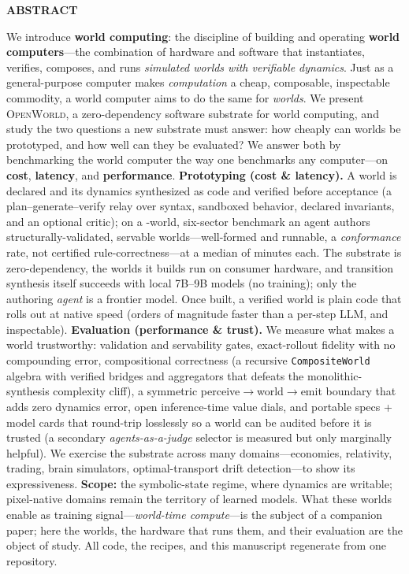 \documentclass[11pt]{article}
\newcommand{\openworld}{\textsc{OpenWorld}}
\begin{document}
\vspace{0.28em}
\begin{tcolorbox}[breakable, enhanced, colback=white, colframe=black!12,
  arc=3pt, boxrule=0.5pt, left=18pt, right=16pt, top=7pt, bottom=6pt,
  borderline west={3pt}{0pt}{cardblue}, drop fuzzy shadow=black!18]
\setlength{\parskip}{0pt}
{\sffamily\bfseries\color{cardblue} ABSTRACT}\par
\smallskip
\fontsize{9.0}{10.7}\selectfont
We introduce \textbf{world computing}: the discipline of building and operating \textbf{world
computers}---the combination of hardware and software that instantiates, verifies, composes, and
runs \emph{simulated worlds with verifiable dynamics}. Just as a general-purpose computer makes
\emph{computation} a cheap, composable, inspectable commodity, a world computer aims to do the
same for \emph{worlds}. We present \openworld{}, a zero-dependency software substrate for world
computing, and study the two questions a new substrate must answer: how cheaply can worlds be
prototyped, and how well can they be evaluated? We answer both by benchmarking the
world computer the way one benchmarks any computer---on \textbf{cost}, \textbf{latency}, and
\textbf{performance}. \textbf{Prototyping (cost \& latency).} A world is declared and its
dynamics synthesized as code and verified before acceptance (a plan--generate--verify
relay over syntax, sandboxed behavior, declared invariants, and an optional critic); on a
\ProtoNumWorlds-world, six-sector benchmark an agent authors structurally-validated,
servable worlds---well-formed and runnable, a \emph{conformance} rate, not certified
rule-correctness---at a median of \ProtoMedianMinutes{} minutes each. The substrate is
zero-dependency, the worlds it builds run on consumer hardware, and transition synthesis
itself succeeds with local 7B--9B models (no training); only the authoring \emph{agent} is a
frontier model. Once built, a verified world is plain code that rolls out
at native speed (orders of magnitude faster than a per-step LLM, and inspectable). \textbf{Evaluation
(performance \& trust).} We measure what makes a world trustworthy: validation and servability
gates, exact-rollout fidelity with no compounding
error, compositional correctness (a recursive \texttt{CompositeWorld} algebra with verified
bridges and aggregators that defeats the monolithic-synthesis complexity cliff), a symmetric
perceive$\to$world$\to$emit boundary that adds zero dynamics error, open inference-time value
dials, and portable specs + model cards that
round-trip losslessly so a world can be audited before it is trusted (a secondary
\emph{agents-as-a-judge} selector is measured but only marginally helpful). We exercise the substrate
across many domains---economies, relativity, trading, brain simulators, optimal-transport drift
detection---to show its expressiveness. \textbf{Scope:} the symbolic-state regime, where dynamics are writable; pixel-native
domains remain the territory of learned models. What these worlds enable as training
signal---\emph{world-time compute}---is the subject of a companion paper; here the worlds, the
hardware that runs them, and their evaluation are the object of study. All code, the
\ProtoNumWorlds{} recipes, and this manuscript regenerate from one repository.


\end{tcolorbox}
\end{document}
